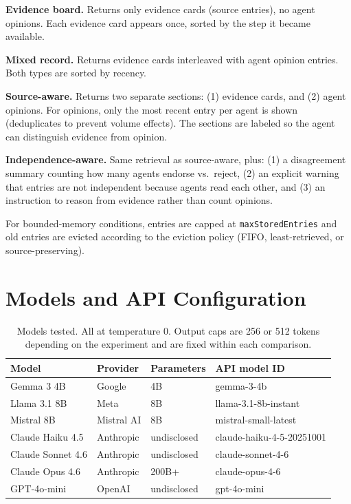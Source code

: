 \textbf{Evidence board.} Returns only evidence cards (source entries), no agent opinions. Each evidence card appears once, sorted by the step it became available.

\textbf{Mixed record.} Returns evidence cards interleaved with agent opinion entries. Both types are sorted by recency.

\textbf{Source-aware.} Returns two separate sections: (1) evidence cards, and (2) agent opinions. For opinions, only the most recent entry per agent is shown (deduplicates to prevent volume effects). The sections are labeled so the agent can distinguish evidence from opinion.

\textbf{Independence-aware.} Same retrieval as source-aware, plus: (1) a disagreement summary counting how many agents endorse vs.\ reject, (2) an explicit warning that entries are not independent because agents read each other, and (3) an instruction to reason from evidence rather than count opinions.

For bounded-memory conditions, entries are capped at \texttt{maxStoredEntries} and old entries are evicted according to the eviction policy (FIFO, least-retrieved, or source-preserving).

\section{Models and API Configuration}
\label{app:models}

\begin{table}[htbp]
\caption{Models tested. All at temperature 0. Output caps are 256 or 512 tokens depending on the experiment and are fixed within each comparison.}
\label{tab:models}
\begin{center}
\small
\begin{tabular}{llll}
\toprule
Model & Provider & Parameters & API model ID \\
\midrule
Gemma 3 4B & Google & 4B & gemma-3-4b \\
Llama 3.1 8B & Meta & 8B & llama-3.1-8b-instant \\
Mistral 8B & Mistral AI & 8B & mistral-small-latest \\
Claude Haiku 4.5 & Anthropic & undisclosed & claude-haiku-4-5-20251001 \\
Claude Sonnet 4.6 & Anthropic & undisclosed & claude-sonnet-4-6 \\
Claude Opus 4.6 & Anthropic & 200B+ & claude-opus-4-6 \\
GPT-4o-mini & OpenAI & undisclosed & gpt-4o-mini \\
\bottomrule
\end{tabular}
\end{center}
\end{table}

